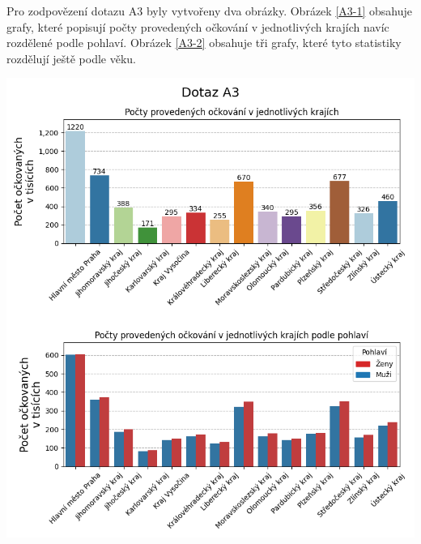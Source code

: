 \documentclass[12pt]{article}
\begin{document}
Pro zodpovězení dotazu A3 byly vytvořeny dva obrázky. Obrázek \ref{A3-1} obsahuje grafy, které popisují počty provedených očkování v jednotlivých krajích navíc rozdělené podle pohlaví. Obrázek \ref{A3-2} obsahuje tři grafy, které tyto statistiky rozdělují ještě podle věku.

\begin{center}
    \includegraphics[width=0.7\paperwidth]{A3-kraje-a-pohlavi.png}
    \label{A3-1}
\end{center}
\end{document}
